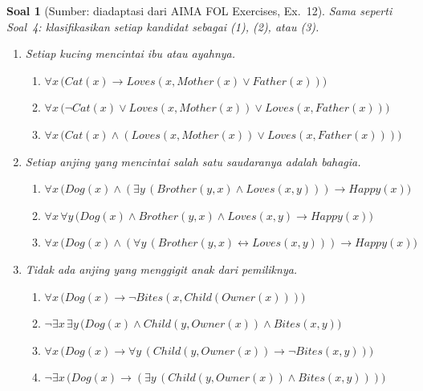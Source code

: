 \documentclass[12pt,a4paper]{article}
\theoremstyle{soaljarak}
\newtheorem{soal}{Soal}
\begin{document}
\begin{soal}[\normalfont Sumber: diadaptasi dari AIMA FOL Exercises, Ex.~12]
  Sama seperti Soal~4: klasifikasikan setiap kandidat sebagai (1), (2), atau (3).
  \begin{enumerate}
    \item Setiap kucing mencintai ibu atau ayahnya.
    \begin{enumerate}
      \item \(\forall x\,\bigl(\mathit{Cat}(x) \rightarrow \mathit{Loves}(x, \mathit{Mother}(x) \vee \mathit{Father}(x))\bigr)\)
      \item \(\forall x\,\bigl(\neg\mathit{Cat}(x) \vee \mathit{Loves}(x,\mathit{Mother}(x)) \vee \mathit{Loves}(x,\mathit{Father}(x))\bigr)\)
      \item \(\forall x\,\bigl(\mathit{Cat}(x) \wedge (\mathit{Loves}(x,\mathit{Mother}(x)) \vee \mathit{Loves}(x,\mathit{Father}(x)))\bigr)\)
    \end{enumerate}
    \item Setiap anjing yang mencintai salah satu saudaranya adalah bahagia.
    \begin{enumerate}
      \item \(\forall x\,\bigl(\mathit{Dog}(x) \wedge (\exists y\,(\mathit{Brother}(y,x) \wedge \mathit{Loves}(x,y))) \rightarrow \mathit{Happy}(x)\bigr)\)
      \item \(\forall x\,\forall y\,\bigl(\mathit{Dog}(x) \wedge \mathit{Brother}(y,x) \wedge \mathit{Loves}(x,y) \rightarrow \mathit{Happy}(x)\bigr)\)
      \item \(\forall x\,\bigl(\mathit{Dog}(x) \wedge (\forall y\,(\mathit{Brother}(y,x) \leftrightarrow \mathit{Loves}(x,y))) \rightarrow \mathit{Happy}(x)\bigr)\)
    \end{enumerate}
    \item Tidak ada anjing yang menggigit anak dari pemiliknya.
    \begin{enumerate}
      \item \(\forall x\,\bigl(\mathit{Dog}(x) \rightarrow \neg\mathit{Bites}(x, \mathit{Child}(\mathit{Owner}(x)))\bigr)\)
      \item \(\neg\exists x\,\exists y\,\bigl(\mathit{Dog}(x) \wedge \mathit{Child}(y,\mathit{Owner}(x)) \wedge \mathit{Bites}(x,y)\bigr)\)
      \item \(\forall x\,\bigl(\mathit{Dog}(x) \rightarrow \forall y\,(\mathit{Child}(y,\mathit{Owner}(x)) \rightarrow \neg\mathit{Bites}(x,y))\bigr)\)
      \item \(\neg\exists x\,\bigl(\mathit{Dog}(x) \rightarrow (\exists y\,(\mathit{Child}(y,\mathit{Owner}(x)) \wedge \mathit{Bites}(x,y)))\bigr)\)
    \end{enumerate}
  \end{enumerate}
\end{soal}
\end{document}
